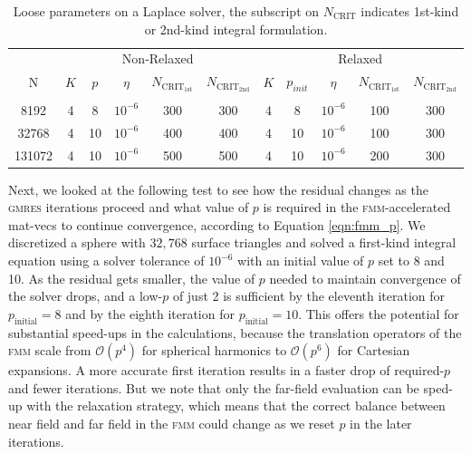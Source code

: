 \documentclass[final,3p,times]{elsarticle}
\newcommand{\fmm}{\textsc{fmm}\xspace}
\newcommand{\bigO}{\mathcal{O}}
\newcommand{\ncrit}{N_{\text{CRIT}}}
\newcommand{\gmres}{\textsc{gmres}\xspace}
\begin{document}
\begin{table}[h]
\footnotesize
\begin{center}
\begin{tabular}{c|ccccc|ccccc}
  & \multicolumn{5}{c|}{Non-Relaxed} & \multicolumn{5}{c}{Relaxed}\\
  N & $K$ & $p$ & $\eta$ & $N_{\text{CRIT}_\text{1st}}$ & $N_{\text{CRIT}_\text{2nd}}$ & $K$ & $p_{init}$ & $\eta$ & $N_{\text{CRIT}_\text{1st}}$ & $N_{\text{CRIT}_\text{2nd}}$\\
 \hline
   & & & & & & & & & &\\
  8192 & 4 & 8 & $10^{-6}$ & 300 & 300 & 4 & 8 & $10^{-6}$ & 100 & 300\\
  32768  & 4 & 10 & $10^{-6}$ & 400 & 400 & 4 & 10 & $10^{-6}$ & 100 & 300\\
  131072  & 4 & 10 & $10^{-6}$ & 500 & 500 & 4 & 10 & $10^{-6}$ & 200 & 300\\
 
\end{tabular}
\end{center}
\caption{Loose parameters on a Laplace solver, the subscript on $\ncrit$ indicates 1st-kind or 2nd-kind integral formulation.}
\label{tab:laplace_loose_params}
\end{table}%

Next, we looked at the following test to see how the residual changes as the \gmres iterations proceed and  what value of $p$ is required in the \fmm-accelerated mat-vecs to continue convergence, according to Equation \eqref{eqn:fmm_p}. We discretized a sphere with $32,768$ surface triangles and solved a first-kind integral equation using a solver tolerance of $10^{-6}$ with an initial value of $p$ set to 8 and 10. As the residual gets smaller, the value of $p$ needed to maintain convergence of the solver drops, and a low-$p$ of just 2 is sufficient by the eleventh iteration for $p_\text{{initial}}=8$ and by the eighth iteration for $p_{\text{initial}}=10$. This offers the potential for substantial speed-ups in the calculations, because the translation operators of the \fmm scale from $\bigO(p^{4})$ for spherical harmonics to $\bigO(p^{6})$ for Cartesian expansions. A more accurate first iteration results in a faster drop of required-$p$ and fewer iterations. 
But we note that only the far-field evaluation can be sped-up with the relaxation strategy, which means that the correct balance between near field and far field in the \fmm could change as we reset $p$ in the later iterations.
\end{document}
